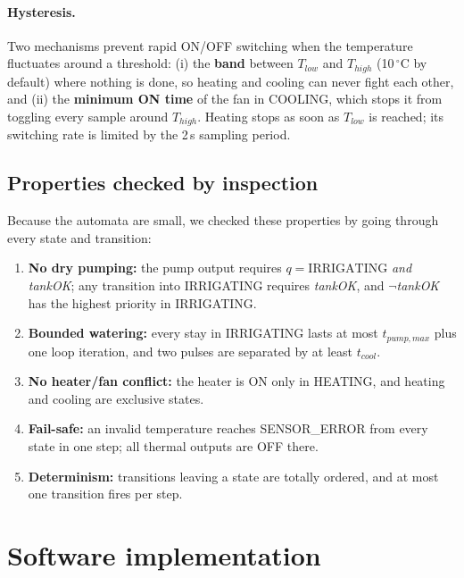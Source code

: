 \documentclass[10pt,a4paper,twocolumn]{article}
\begin{document}
\paragraph{Hysteresis.} Two mechanisms prevent rapid ON/OFF switching when the
temperature fluctuates around a threshold: (i) the \textbf{band} between $T_{low}$ and
$T_{high}$ (10\,$^\circ$C by default) where nothing is done, so heating and cooling can
never fight each other, and (ii) the \textbf{minimum ON time} of the fan in COOLING,
which stops it from toggling every sample around $T_{high}$. Heating stops as soon as
$T_{low}$ is reached; its switching rate is limited by the 2\,s sampling period.

\subsection{Properties checked by inspection}
Because the automata are small, we checked these properties by going through every
state and transition:
\begin{enumerate}
  \item \textbf{No dry pumping:} the pump output requires $q=\text{IRRIGATING}$
        \emph{and} \textit{tankOK}; any transition into IRRIGATING requires
        \textit{tankOK}, and $\neg$\textit{tankOK} has the highest priority in
        IRRIGATING.
  \item \textbf{Bounded watering:} every stay in IRRIGATING lasts at most
        $t_{pump,max}$ plus one loop iteration, and two pulses are separated by at
        least $t_{cool}$.
  \item \textbf{No heater/fan conflict:} the heater is ON only in HEATING, and
        heating and cooling are exclusive states.
  \item \textbf{Fail-safe:} an invalid temperature reaches SENSOR\_ERROR from every
        state in one step; all thermal outputs are OFF there.
  \item \textbf{Determinism:} transitions leaving a state are totally ordered, and at
        most one transition fires per step.
\end{enumerate}

\section{Software implementation}\label{sec:software}
\end{document}
